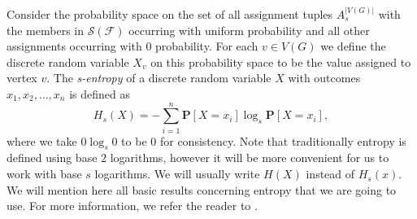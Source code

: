 \documentclass[a4paper, 14pt]{extarticle}
\theoremstyle{plain}
\def\mc{\mathcal}
\def\mb{\mathbf}
\begin{document}


Consider the probability space on the set of all assignment tuples
$A_s^{|V(G)|}$ with the members in $\mc{S}(\mc{F})$ occurring with
uniform probability and all other assignments occurring with $0$
probability. For each $v\in V(G)$ we define the discrete random
variable $X_v$ on this probability space to be the value assigned to
vertex $v$. The \emph{s-entropy} of a discrete random variable $X$
with outcomes $x_1,x_2,\ldots,x_n$ is defined as
\[
H_s(X) = -\sum_{i=1}^n \mb{P}[X=x_i]\log_s\mb{P}[X=x_i],
\]
where we take $0\log_s 0$ to be $0$ for consistency. Note that
traditionally entropy is defined using base $2$ logarithms, however
it will be more convenient for us to work with base $s$ logarithms. We will usually write $H(X)$ instead of $H_s(x)$. We will mention here all basic results concerning entropy that we are going to use. For more information, we refer the reader to \cite{Cover&Thomas}.
\end{document}

